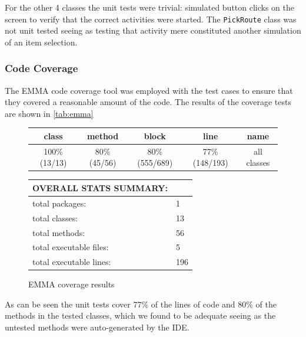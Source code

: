 For the other 4 classes the unit tests were trivial: simulated button clicks on the screen to verify that the correct activities were started. The \texttt{PickRoute} class was not unit tested seeing as testing that activity mere constituted another simulation of an item selection.

\subsubsection{Code Coverage}
The EMMA code coverage tool was employed with the test cases to ensure that they covered a reasonable amount of the code. The results of the coverage tests are shown in \autoref{tab:emma}

\begin{figure}[ht]
\caption{EMMA coverage results}
\label{tab:emma}
\begin{tabular}{| c | c | c | c | c |}
\hline
class & method & block & line & name \\ \hline
100\% (13/13) & 80\% (45/56) & 80\% (555/689) & 77\% (148/193) & all classes \\
\hline
\end{tabular}
\vspace{10pt}

\begin{tabular}{| l | l |}
\hline
OVERALL STATS SUMMARY: & \\ \hline
total packages: & 1 \\
total classes: & 13 \\
total methods: & 56 \\
total executable files: & 5 \\
total executable lines: & 196 \\
\hline
\end{tabular}
\end{figure}

As can be seen the unit tests cover 77\% of the lines of code and 80\% of the methods in the tested classes, which we found to be adequate seeing as the untested methods were auto-generated by the \ac{IDE}.  